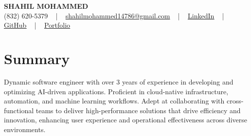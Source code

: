 \documentclass[letterpaper,10pt]{article}
\begin{document}
\begin{center}
    {\fontsize{14pt}{12pt}\selectfont \textbf{\MakeUppercase{Shahil Mohammed}}}\\ \vspace{2pt}
    \fontsize{10pt}{12pt}\selectfont (832) 620-5379 ~ | ~ \href{mailto:shahilmohammed14786@gmail.com}{shahilmohammed14786@gmail.com} ~ | ~  
    \href{https://www.linkedin.com/in/shahil-mohammed-9652931a1/}{\color{blue}\underline{LinkedIn}}  ~ | ~ 
    \href{https://github.com/freakbeast14}{\color{blue}\underline{GitHub}} ~ | ~ 
    \href{https://shahil-mohammed.netlify.app/}{\color{blue}\underline{Portfolio}}
    \vspace{-8pt}
\end{center}

\section{Summary}
\vspace{-2pt}\fontsize{8pt}{9pt}\selectfont
Dynamic software engineer with over 3 years of experience in developing and optimizing AI-driven applications. Proficient in cloud-native infrastructure, automation, and machine learning workflows. Adept at collaborating with cross-functional teams to deliver high-performance solutions that drive efficiency and innovation, enhancing user experience and operational effectiveness across diverse environments.
 \vspace{-5pt}
 
\vspace{-2pt}
\end{document}

